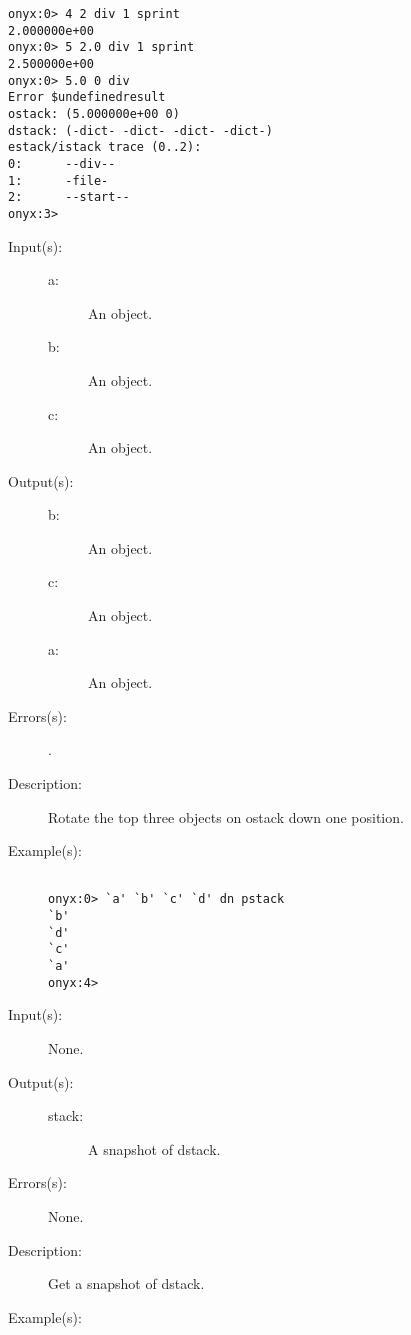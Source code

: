 \begin{description}
\begin{description}
\begin{verbatim}
onyx:0> 4 2 div 1 sprint
2.000000e+00
onyx:0> 5 2.0 div 1 sprint
2.500000e+00
onyx:0> 5.0 0 div
Error $undefinedresult
ostack: (5.000000e+00 0)
dstack: (-dict- -dict- -dict- -dict-)
estack/istack trace (0..2):
0:      --div--
1:      -file-
2:      --start--
onyx:3>
		\end{verbatim}
	\end{description}
\label{systemdict:dn}
\item[{\onyxop{a b c}{dn}{b c a}}: ]
	\begin{description}\item[]
	\item[Input(s): ]
		\begin{description}\item[]
		\item[a: ]
			An object.
		\item[b: ]
			An object.
		\item[c: ]
			An object.
		\end{description}
	\item[Output(s): ]
		\begin{description}\item[]
		\item[b: ]
			An object.
		\item[c: ]
			An object.
		\item[a: ]
			An object.
		\end{description}
	\item[Errors(s): ]
		\begin{description}\item[]
		\item[.]
		\end{description}
	\item[Description: ]
		Rotate the top three objects on ostack down one position.
	\item[Example(s): ]\begin{verbatim}

onyx:0> `a' `b' `c' `d' dn pstack
`b'
`d'
`c'
`a'
onyx:4>
		\end{verbatim}
	\end{description}
\label{systemdict:dstack}
\item[{\onyxop{--}{dstack}{stack}}: ]
	\begin{description}\item[]
	\item[Input(s): ] None.
	\item[Output(s): ]
		\begin{description}\item[]
		\item[stack: ]
			A snapshot of dstack.
		\end{description}
	\item[Errors(s): ] None.
	\item[Description: ]
		Get a snapshot of dstack.
	\item[Example(s): ]\begin{verbatim}


\end{verbatim}
\end{description}
\end{description}
